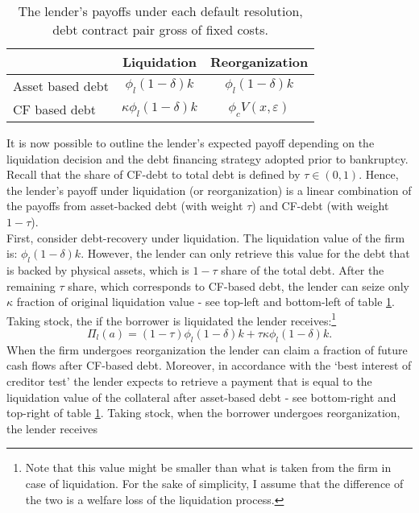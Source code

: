 \documentclass[12pt]{article}
\begin{document}
\begin{table}[h!]
    \centering
    \begin{tabular}{l|cc}
        & Liquidation  & Reorganization \\  
       \midrule
      Asset based debt & $ \phi_l (1-\delta) k$  &  $ \phi_l (1-\delta) k$ \\
      CF based debt & $ \kappa \phi_l (1-\delta) k $ & $ \phi_c V(x,\varepsilon)$ \\ 
     \bottomrule
     \end{tabular}
    \caption{\small The lender's payoffs under each default resolution, debt contract pair gross of fixed costs.} 
    \label{tab:lender payoffs}
\end{table}
\noindent It is now possible to outline the lender's expected payoff depending on the liquidation decision and the debt financing strategy adopted prior to bankruptcy. Recall that the share of CF-debt to total debt is defined by $\tau \in (0,1)$. Hence, the lender's payoff under liquidation (or reorganization) is a linear combination of the payoffs from asset-backed debt (with weight $\tau$) and CF-debt (with weight $1-\tau$). \vspace{3mm} \\
First, consider debt-recovery under liquidation. The liquidation value of the firm is: $\phi_l (1-\delta) k$. However, the lender can only retrieve this value for the debt that is backed by physical assets, which is $1-\tau$ share of the total debt. After the remaining $\tau$ share, which corresponds to CF-based debt, the lender can seize only $\kappa$ fraction of original liquidation value - see top-left and bottom-left of table \ref{tab:lender payoffs}. Taking stock, the if the borrower is liquidated the lender receives:\footnote{Note that this value might be smaller than what is taken from the firm in case of liquidation. For the sake of simplicity, I assume that the difference of the two is a welfare loss of the liquidation process.}  
\begin{equation} \label{eq:P_liq} 
   \Pi_{l}(a) = (1-\tau) \phi_l (1-\delta) k +\tau \kappa \phi_l  (1-\delta) k. 
\end{equation}
When the firm undergoes reorganization the lender can claim a fraction of future cash flows after CF-based debt. Moreover, in accordance with the `best interest of creditor test' the lender expects to retrieve a payment that is equal to the liquidation value of the collateral after asset-based debt - see bottom-right and top-right of table \ref{tab:lender payoffs}. Taking stock, when the borrower undergoes reorganization, the lender receives
\end{document}
